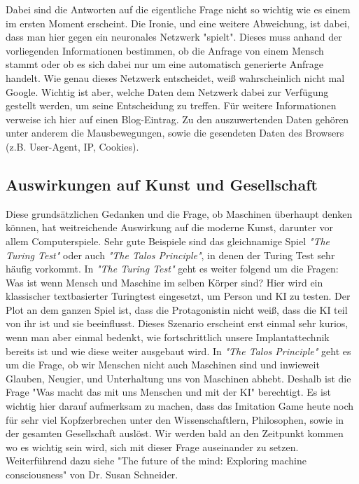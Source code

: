Dabei sind die Antworten auf die eigentliche Frage nicht so wichtig wie es einem im ersten Moment erscheint. Die Ironie, und eine weitere Abweichung, ist dabei, dass man hier gegen ein neuronales Netzwerk "spielt". Dieses muss anhand der vorliegenden Informationen bestimmen, ob die Anfrage von einem Mensch stammt oder ob es sich dabei nur um eine automatisch generierte Anfrage handelt. Wie genau dieses Netzwerk entscheidet, weiß wahrscheinlich nicht mal Google. Wichtig ist aber, welche Daten dem Netzwerk dabei zur Verfügung gestellt werden, um seine Entscheidung zu treffen. Für weitere Informationen verweise ich hier auf einen Blog-Eintrag\cite{captcha}. Zu den auszuwertenden Daten gehören unter anderem die Mausbewegungen, sowie die gesendeten Daten des Browsers (z.B. User-Agent, IP, Cookies).
\subsection{Auswirkungen auf Kunst und Gesellschaft}
Diese grundsätzlichen Gedanken und die Frage, ob Maschinen überhaupt denken können, hat weitreichende Auswirkung auf die moderne Kunst, darunter vor allem Computerspiele. Sehr gute Beispiele sind das gleichnamige Spiel \textit{"The Turing Test"} oder auch \textit{"The Talos Principle"}, in denen der Turing Test sehr häufig vorkommt. In \textit{"The Turing Test"} geht es weiter folgend um die Fragen: Was ist wenn Mensch und Maschine im selben Körper sind? Hier wird ein klassischer textbasierter Turingtest eingesetzt, um Person und KI zu testen. Der Plot an dem ganzen Spiel ist, dass die Protagonistin nicht weiß, dass die KI teil von ihr ist und sie beeinflusst. Dieses Szenario erscheint erst einmal sehr kurios, wenn man aber einmal bedenkt, wie fortschrittlich unsere Implantattechnik bereits ist und wie diese weiter ausgebaut wird. In \textit{"The Talos Principle"} geht es um die Frage, ob wir Menschen nicht auch Maschinen sind und inwieweit Glauben, Neugier, und Unterhaltung uns von Maschinen abhebt. Deshalb ist die Frage "Was macht das mit uns Menschen und mit der KI" berechtigt. Es ist wichtig hier darauf aufmerksam zu machen, dass das Imitation Game heute noch für sehr viel Kopfzerbrechen unter den Wissenschaftlern, Philosophen, sowie in der gesamten Gesellschaft auslöst. Wir werden bald an den Zeitpunkt kommen wo es wichtig sein wird, sich mit dieser Frage auseinander zu setzen. Weiterführend dazu siehe "The future of the mind: Exploring machine consciousness" von Dr. Susan Schneider. \cite{explorecons}
